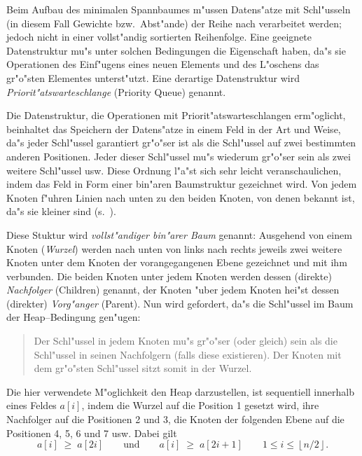 Beim Aufbau des minimalen Spannbaumes m"ussen Datens"atze mit Schl"usseln (in diesem Fall
Gewichte bzw.\ Abst"ande) der Reihe nach verarbeitet werden; jedoch nicht in einer vollst"andig
sortierten Reihenfolge.
Eine geeignete Datenstruktur mu"s unter solchen Bedingungen die Eigenschaft haben, da"s sie
Operationen des Einf"ugens eines neuen Elements und des L"oschens das gr"o"sten Elementes
unterst"utzt. Eine derartige Datenstruktur wird {\em Priorit"atswarteschlange\/}
(Priority Queue) genannt.

Die Datenstruktur, die Operationen mit Priorit"atswarteschlangen erm"oglicht,
beinhaltet das Speichern der Datens"atze in einem Feld in der Art und Weise,
da"s jeder Schl"ussel garantiert
gr"o"ser ist als die Schl"ussel auf zwei bestimmten anderen Positionen. Jeder dieser
Schl"ussel mu"s wiederum gr"o"ser sein als zwei weitere Schl"ussel usw. Diese Ordnung
l"a"st sich sehr leicht veranschaulichen, indem das Feld in Form einer
bin"aren Baumstruktur gezeichnet wird. Von jedem Knoten f"uhren Linien
nach unten zu den beiden Knoten, von denen bekannt ist, da"s sie kleiner sind
(s.\ ).


Diese Stuktur wird {\em vollst"andiger bin"arer Baum\/} genannt: Ausgehend von einem
Knoten ({\em Wurzel\/}) werden nach unten von links nach rechts jeweils
zwei weitere Knoten unter dem Knoten der vorangegangenen Ebene gezeichnet und mit
ihm verbunden. Die beiden Knoten unter jedem
Knoten werden dessen (direkte) {\em Nachfolger\/} (Children) genannt, der Knoten "uber
jedem Knoten hei"st dessen (direkter) {\em Vorg"anger\/} (Parent). Nun wird gefordert,
da"s die Schl"ussel im Baum der Heap--Bedingung gen"ugen:

\begin{quote}
  Der Schl"ussel in jedem Knoten mu"s gr"o"ser (oder gleich) sein als die Schl"ussel
  in seinen Nachfolgern (falls diese existieren). Der Knoten mit dem gr"o"sten Schl"ussel
  sitzt somit in der Wurzel.
\end{quote}

Die hier verwendete M"oglichkeit den Heap darzustellen, ist sequentiell innerhalb
eines Feldes $a[i]$, indem
die Wurzel auf die Position 1 gesetzt wird, ihre Nachfolger auf die Positionen
2 und 3, die Knoten der folgenden Ebene auf die Positionen 4, 5, 6 und 7 usw. Dabei
gilt
$$a[i] \; \ge \; a[2i] \qquad \mbox{und} \qquad a[i] \; \ge \; a[2i+1] \qquad 1\le i\le
  \left\lfloor n/2 \right\rfloor.$$

